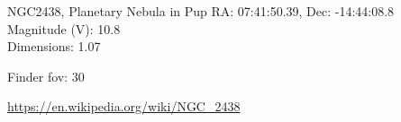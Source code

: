 \begin{block}{NGC2438, Planetary Nebula in Pup}
    RA: 07:41:50.39, Dec: -14:44:08.8 \\ 
    Magnitude (V): 10.8 \\ 
    Dimensions: 1.07 

    Finder fov: 30 

    \url{https://en.wikipedia.org/wiki/NGC_2438} 
\end{block}